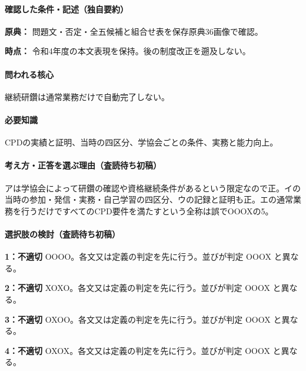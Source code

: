 \paragraph{確認した条件・記述（独自要約）}\mbox{}\par

\noindent\textbf{原典：} 問題文・否定・全五候補と組合せ表を保存原典36画像で確認。\par

\noindent\textbf{時点：} 令和4年度の本文表現を保持。後の制度改正を遡及しない。\par

\paragraph{問われる核心} 継続研鑽は通常業務だけで自動完了しない。

\paragraph{必要知識} CPDの実績と証明、当時の四区分、学協会ごとの条件、実務と能力向上。

\paragraph{考え方・正答を選ぶ理由（査読待ち初稿）} アは学協会によって研鑽の確認や資格継続条件があるという限定なので正。イの当時の参加・発信・実務・自己学習の四区分、ウの記録と証明も正。エの通常業務を行うだけですべてのCPD要件を満たすという全称は誤でOOOXの5。

\paragraph{選択肢の検討（査読待ち初稿）}\mbox{}\par

\noindent\textbf{1：不適切} OOOO。各文又は定義の判定を先に行う。並びが判定 OOOX と異なる。\par

\noindent\textbf{2：不適切} XOXO。各文又は定義の判定を先に行う。並びが判定 OOOX と異なる。\par

\noindent\textbf{3：不適切} OXOO。各文又は定義の判定を先に行う。並びが判定 OOOX と異なる。\par

\noindent\textbf{4：不適切} OXOX。各文又は定義の判定を先に行う。並びが判定 OOOX と異なる。\par

